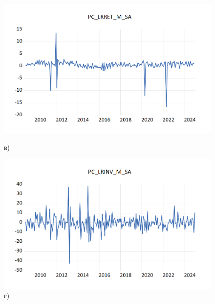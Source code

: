 \documentclass[a4paper, 14pt]{extreport}
\numberwithin{equation}{section}
\numberwithin{equation}{section}
\begin{document}
\begin{figure}[h!]
		\begin{minipage}{0.5\textwidth}
			\centering
			\includegraphics[scale=0.4]{images/image24}
			\caption*{в)}
		\end{minipage}%
		\hfill %
		\begin{minipage}{0.5\textwidth}
			\centering			\includegraphics[scale=0.4]{images/image25}
			\caption*{г)}
		\end{minipage}%
		

\end{figure}
\end{document}

